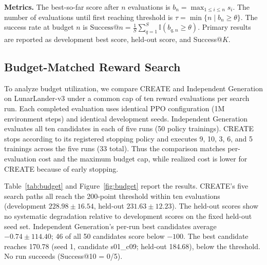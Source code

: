 \documentclass[letterpaper,twocolumn,10pt]{article}
\begin{document}
\textbf{Metrics.} The best-so-far score after $n$ evaluations is $b_n = \max_{1 \leq i \leq n} s_i$. The number of evaluations until first reaching threshold is $\tau = \min\{n \mid b_n \geq \theta\}$. The success rate at budget $n$ is $\text{Success}@n = \frac{1}{S}\sum_{q=1}^{S} \mathbb{I}(b_{q,n} \geq \theta)$. Primary results are reported as development best score, held-out score, and Success@$K$.

\subsection{Budget-Matched Reward Search}

To analyze budget utilization, we compare CREATE and Independent Generation on LunarLander-v3 under a common cap of ten reward evaluations per search run. Each completed evaluation uses identical PPO configuration (1M environment steps) and identical development seeds. Independent Generation evaluates all ten candidates in each of five runs (50 policy trainings). CREATE stops according to its registered stopping policy and executes 9, 10, 3, 6, and 5 trainings across the five runs (33 total). Thus the comparison matches per-evaluation cost and the maximum budget cap, while realized cost is lower for CREATE because of early stopping.

Table~\ref{tab:budget} and Figure~\ref{fig:budget} report the results. CREATE's five search paths all reach the 200-point threshold within ten evaluations (development $228.98 \pm 16.54$, held-out $231.63 \pm 12.23$). The held-out scores show no systematic degradation relative to development scores on the fixed held-out seed set. Independent Generation's per-run best candidates average $-0.74 \pm 114.40$; 46 of all 50 candidates score below $-100$. The best candidate reaches 170.78 (seed 1, candidate s01\_c09; held-out 184.68), below the threshold. No run succeeds (Success@10 = 0/5).

\begin{table}[t]
\centering
\caption{Common-cap comparison on LunarLander-v3. Both methods permit at most ten evaluations per run, each using 1M PPO steps. Independent Generation executes 50 trainings; CREATE executes 33 because of early stopping. Held-out: 100 episodes, seeds 50000--50099, never returned to the LLM. Values are mean $\pm$ std over five runs. \label{tab:budget}}
\end{table}
\end{document}
